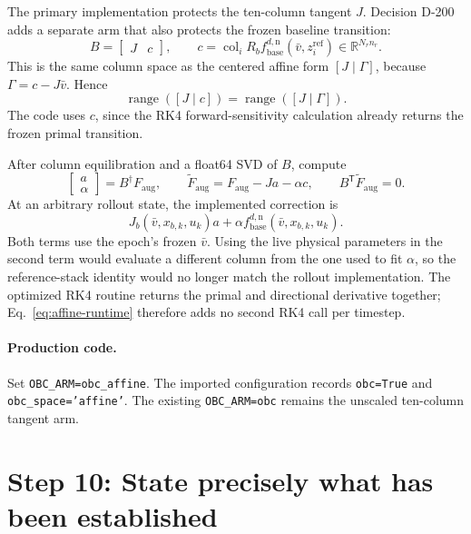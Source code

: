 \documentclass[11pt,a4paper]{article}
\newcommand{\R}{\mathbb{R}}
\newcommand{\col}{\operatorname{col}}
\newcommand{\range}{\operatorname{range}}
\newcommand{\T}{\mathsf{T}}
\newcommand{\code}[1]{\texttt{#1}}
\begin{document}
The primary implementation protects the ten-column tangent \(J\). Decision
D-200 adds a separate arm that also protects the frozen baseline transition:
\begin{equation}
\boxed{
B=\begin{bmatrix}J&c\end{bmatrix},\qquad
c=\col_i R_b f_{\mathrm{base}}^{d,\mathrm n}
   (\bar v,z_i^{\mathrm{ref}})\in\R^{N_rn_r}.
}
\label{eq:affine-basis}
\end{equation}
This is the same column space as the centered affine form
\([J\mid\Gamma]\), because \(\Gamma=c-J\bar v\). Hence
\begin{equation}
\range([J\mid c])=\range([J\mid\Gamma]).
\end{equation}
The code uses \(c\), since the RK4 forward-sensitivity calculation already
returns the frozen primal transition.

After column equilibration and a float64 SVD of \(B\), compute
\begin{equation}
\begin{bmatrix}a\\ \alpha\end{bmatrix}=B^\dagger F_{\mathrm{aug}},
\qquad
\widetilde F_{\mathrm{aug}}=F_{\mathrm{aug}}-Ja-\alpha c,
\qquad
B^\T\widetilde F_{\mathrm{aug}}=0.
\end{equation}
At an arbitrary rollout state, the implemented correction is
\begin{equation}
\boxed{
J_b(\bar v,x_{b,k},u_k)a
+\alpha f_{\mathrm{base}}^{d,\mathrm n}(\bar v,x_{b,k},u_k).
}
\label{eq:affine-runtime}
\end{equation}
Both terms use the epoch's frozen \(\bar v\). Using the live physical
parameters in the second term would evaluate a different column from the one
used to fit \(\alpha\), so the reference-stack identity would no longer match
the rollout implementation. The optimized RK4 routine returns the primal and
directional derivative together; Eq.~\eqref{eq:affine-runtime} therefore adds
no second RK4 call per timestep.

\paragraph{Production code.}
Set \code{OBC\_ARM=obc\_affine}. The imported configuration records
\code{obc=True} and \code{obc\_space='affine'}. The existing
\code{OBC\_ARM=obc} remains the unscaled ten-column tangent arm.

\clearpage
\section{Step 10: State precisely what has been established}
\end{document}
